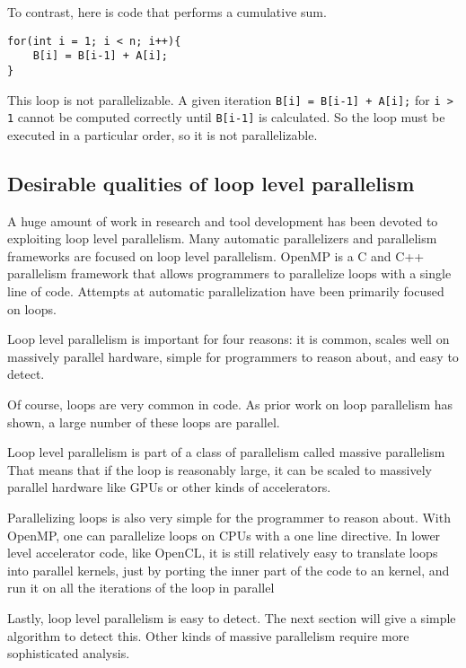 \documentclass[12pt,twoside]{reedthesis}
\begin{document}
		To contrast, here is code that performs a cumulative sum. 
		
		\begin{lstlisting}
for(int i = 1; i < n; i++){
	B[i] = B[i-1] + A[i];
}
		\end{lstlisting}
		
		This loop is not parallelizable. A given iteration \texttt{B[i] = B[i-1] + A[i];} for \texttt{i > 1} cannot be computed correctly until \texttt{B[i-1]} is calculated. So the loop must be executed in a particular order, so it is not parallelizable. 
		
		\subsection{Desirable qualities of loop level parallelism}
		
		A huge amount of work in research and tool development has been devoted to exploiting loop level parallelism. Many automatic parallelizers and parallelism frameworks are focused on loop level parallelism. OpenMP is a C and C++ parallelism framework that allows programmers to parallelize loops with a single line of code. Attempts at automatic parallelization have been primarily focused on loops. 
		
		Loop level parallelism is important for four reasons: it is common, scales well on massively parallel hardware, simple for programmers to reason about, and easy to detect. 
		
		Of course, loops are very common in code. As prior work on loop parallelism has shown, a large number of these loops are parallel. 
		
		Loop level parallelism is part of a class of parallelism called massive parallelism That means that if the loop is reasonably large, it can be scaled to massively parallel hardware like GPUs or other kinds of accelerators. 
		
		Parallelizing loops is also very simple for the programmer to reason about. With OpenMP, one can parallelize loops on CPUs with a one line directive. In lower level accelerator code, like OpenCL, it is still relatively easy to translate loops into parallel kernels, just by porting the inner part of the code to an kernel, and run it on all the iterations of the loop in parallel 
		
		Lastly, loop level parallelism is easy to detect. The next section will give a simple algorithm to detect this. Other kinds of massive parallelism require more sophisticated analysis. 
		
\end{document}

